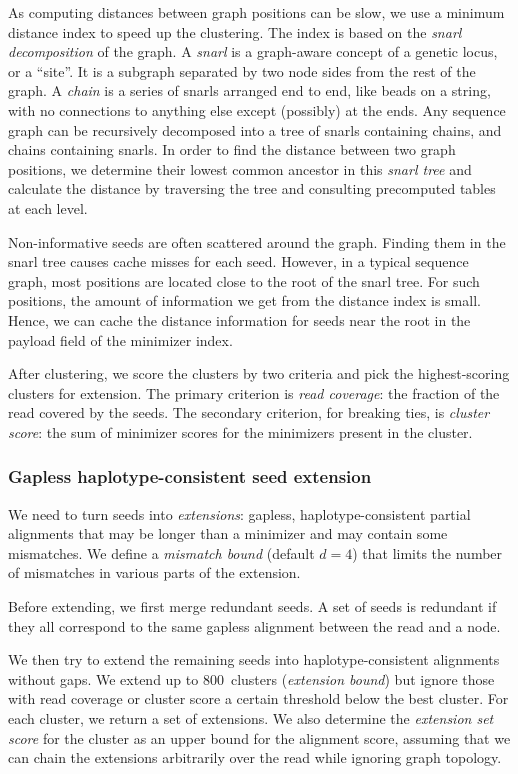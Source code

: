 \documentclass[11pt]{ucscthesis}
\newcommand{\param}[1]{\emph{#1}}
\newcommand{\vocab}[1]{\emph{#1}}
\begin{document}
As computing distances between graph positions can be slow, we use a minimum distance index \cite{chang_distance_2020} to speed up the clustering.
The index is based on the \vocab{snarl decomposition} of the graph.
A \vocab{snarl}\cite{paten_superbubbles_2018} is a graph-aware concept of a genetic locus, or a ``site''.
It is a subgraph separated by two node sides from the rest of the graph.
A \vocab{chain} is a series of snarls arranged end to end, like beads on a string, with no connections to anything else except (possibly) at the ends.
Any sequence graph can be recursively decomposed into a tree of snarls containing chains, and chains containing snarls.
In order to find the distance between two graph positions, we determine their lowest common ancestor in this \vocab{snarl tree} and calculate the distance by traversing the tree and consulting precomputed tables at each level.

Non-informative seeds are often scattered around the graph.
Finding them in the snarl tree causes cache misses for each seed.
However, in a typical sequence graph, most positions are located close to the root of the snarl tree.
For such positions, the amount of information we get from the distance index is small.
Hence, we can cache the distance information for seeds near the root in the payload field of the minimizer index.

After clustering, we score the clusters by two criteria and pick the highest-scoring clusters for extension.
The primary criterion is \vocab{read coverage}: the fraction of the read covered by the seeds.
The secondary criterion, for breaking ties, is \vocab{cluster score}: the sum of minimizer scores for the minimizers present in the cluster.

\subsubsection{Gapless haplotype-consistent seed extension}
\label{subsec:aim2:gapless-extension}
We need to turn seeds into \vocab{extensions}: gapless, haplotype-consistent partial alignments that may be longer than a minimizer and may contain some mismatches. We define a \param{mismatch bound} (default $d = 4$) that limits the number of mismatches in various parts of the extension.

Before extending, we first merge redundant seeds.
A set of seeds is redundant if they all correspond to the same gapless alignment between the read and a node.

We then try to extend the remaining seeds into haplotype-consistent alignments without gaps.
We extend up to 800~clusters (\param{extension bound}) but ignore those with read coverage or cluster score a certain threshold below the best cluster.
For each cluster, we return a set of extensions.
We also determine the \vocab{extension set score} for the cluster as an upper bound for the alignment score, assuming that we can chain the extensions arbitrarily over the read while ignoring graph topology.
\end{document}
